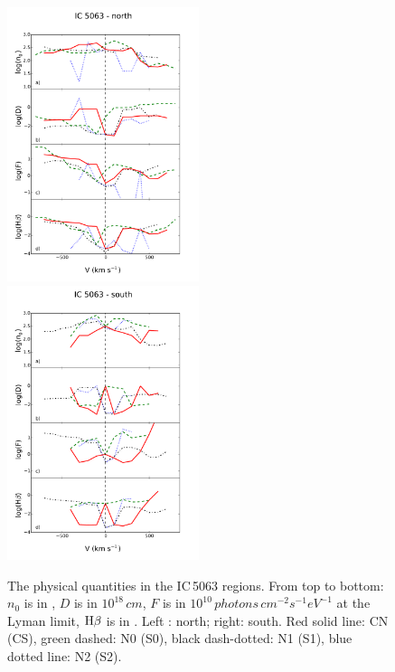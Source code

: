 \documentclass[../main.tex]{subfiles}
\begin{document}
\begin{figure}
\includegraphics[width=0.5\textwidth]{images/paper1/icn.pdf}
\includegraphics[width=0.5\textwidth]{images/paper1/ics.pdf}
\caption{The physical quantities in the IC\,5063 regions. From top to bottom: $n_0$ is in , $D$ is in $10^{18}\,\si{cm}$, $F$ is in $10^{10}\,\si{photons\,cm^{-2} s^{-1} eV^{-1}}$ at the Lyman limit, $\rm H\beta$ is in \erg. Left : north; right: south. Red solid line: CN (CS), green dashed: N0 (S0), black dash-dotted: N1 (S1), blue dotted line: N2 (S2).}
\label{fig:IC_m}
\end{figure}
\end{document}
